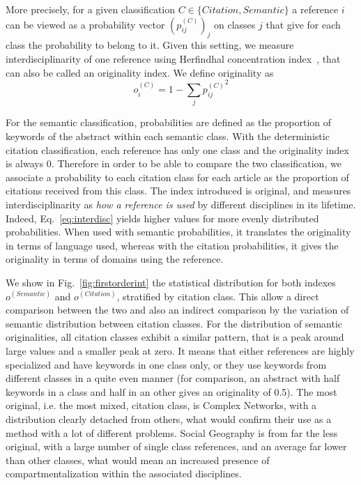 More precisely, for a given classification $C \in \{ Citation,Semantic\}$ a reference $i$ can be viewed as a probability vector $(p_{ij}^{(C)})_j$ on classes $j$ that give for each class the probability to belong to it. Given this setting, we measure interdisciplinarity of one reference using Herfindhal concentration index~\citep{porter2009science}, that can also be called an originality index. We define originality as
\begin{equation}
o_i^{(C)} = 1 - \sum_j {p_{ij}^{(C)}}^2
\label{eq:interdisc}
\end{equation}

For the semantic classification, probabilities are defined as the proportion of keywords of the abstract within each semantic class. With the deterministic citation classification, each reference has only one class and the originality index is always 0. Therefore in order to be able to compare the two classification, we associate a probability to each citation class for each article as the proportion of citations received from this class. The index introduced is original, and measures interdisciplinarity as \emph{how a reference is used} by different disciplines in its lifetime. Indeed, Eq.~\ref{eq:interdisc} yields higher values for more evenly distributed probabilities. When used with semantic probabilities, it translates the originality in terms of language used, whereas with the citation probabilities, it gives the originality in terms of domains using the reference.


We show in Fig.~\ref{fig:firstorderint} the statistical distribution for both indexes $o^{(Semantic)}$ and $o^{(Citation)}$, stratified by citation class. This allow a direct comparison between the two and also an indirect comparison by the variation of semantic distribution between citation classes. For the distribution of semantic originalities, all citation classes exhibit a similar pattern, that is a peak around large values and a smaller peak at zero. It means that either references are highly specialized and have keywords in one class only, or they use keywords from different classes in a quite even manner (for comparison, an abstract with half keywords in a class and half in an other gives an originality of 0.5). The most original, i.e. the most mixed, citation class, is Complex Networks, with a distribution clearly detached from others, what would confirm their use as a method with a lot of different problems. Social Geography is from far the less original, with a large number of single class references, and an average far lower than other classes, what would mean an increased presence of compartmentalization within the associated disciplines.


